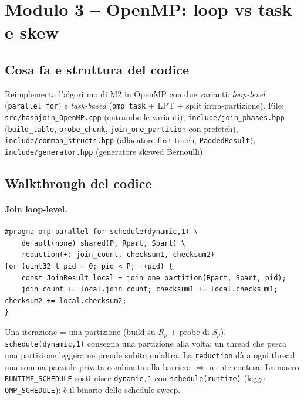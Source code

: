 \documentclass[11pt,a4paper]{article}
\begin{document}
\section{Modulo 3 -- OpenMP: loop vs task e skew}

\subsection{Cosa fa e struttura del codice}

Reimplementa l'algoritmo di M2 in OpenMP con due varianti: \emph{loop-level} (\texttt{parallel for}) e \emph{task-based} (\texttt{omp task} + LPT + split intra-partizione). File: \texttt{src/hashjoin\_OpenMP.cpp} (entrambe le varianti), \texttt{include/join\_phases.hpp} (\texttt{build\_table}, \texttt{probe\_chunk}, \texttt{join\_one\_partition} con prefetch), \texttt{include/common\_structs.hpp} (allocatore first-touch, \texttt{PaddedResult}), \texttt{include/generator.hpp} (generatore skewed Bernoulli).

\subsection{Walkthrough del codice}

\paragraph{Join loop-level.}
\begin{lstlisting}[style=cpp]
#pragma omp parallel for schedule(dynamic,1) \
    default(none) shared(P, Rpart, Spart) \
    reduction(+: join_count, checksum1, checksum2)
for (uint32_t pid = 0; pid < P; ++pid) {
    const JoinResult local = join_one_partition(Rpart, Spart, pid);
    join_count += local.join_count; checksum1 += local.checksum1; checksum2 += local.checksum2;
}
\end{lstlisting}
\begin{whybox}
Una iterazione = una partizione (build su $R_p$ + probe di $S_p$). \texttt{schedule(dynamic,1)} consegna una partizione alla volta: un thread che pesca una partizione leggera ne prende subito un'altra. La \texttt{reduction} dà a ogni thread una somma parziale privata combinata alla barriera $\Rightarrow$ niente contesa. La macro \texttt{RUNTIME\_SCHEDULE} sostituisce \texttt{dynamic,1} con \texttt{schedule(runtime)} (legge \texttt{OMP\_SCHEDULE}): è il binario dello schedule-sweep.
\end{whybox}
\end{document}
